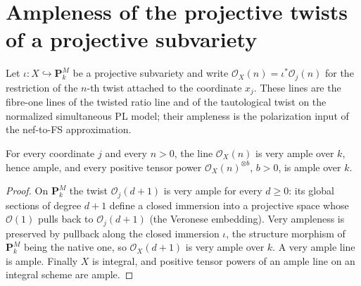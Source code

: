 \section{Ampleness of the projective twists of a projective subvariety}

Let $\iota:X\hookrightarrow\mathbf P^M_k$ be a projective subvariety and write
$\mathcal O_X(n)=\iota^*\mathcal O_j(n)$ for the restriction of the $n$-th twist
attached to the coordinate $x_j$. These lines are the fibre-one lines of the
twisted ratio line and of the tautological twist on the normalized
simultaneous PL model; their ampleness is the polarization input of the
nef-to-FS approximation.

\begin{theorem}
\label{thm:pl-native-twist-line-ample}
\leanok
{}
For every coordinate $j$ and every $n>0$, the line $\mathcal O_X(n)$ is very
ample over $k$, hence ample, and every positive tensor power
$\mathcal O_X(n)^{\otimes b}$, $b>0$, is ample over $k$.
\end{theorem}
\begin{proof}
\leanok
On $\mathbf P^M_k$ the twist $\mathcal O_j(d+1)$ is very ample for every
$d\geq0$: its global sections of degree $d+1$ define a closed immersion into a
projective space whose $\mathcal O(1)$ pulls back to $\mathcal O_j(d+1)$ (the
Veronese embedding). Very ampleness is preserved
by pullback along the closed immersion $\iota$, the structure morphism of
$\mathbf P^M_k$ being the native one, so $\mathcal O_X(d+1)$ is very ample over
$k$. A very ample line is ample. Finally $X$ is integral, and positive tensor
powers of an ample line on an integral scheme are ample.
\end{proof}
